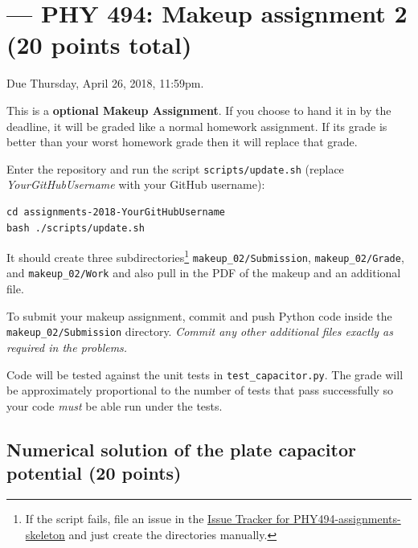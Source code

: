 \documentclass[letterpaper]{scrartcl}
\newcommand{\anumber}{2}
\begin{document}

\setcounter{section}{\anumber}
\addtocounter{section}{-1}
\section{ --- PHY 494: Makeup assignment \anumber{} (20 points total)}

\noindent Due Thursday, April 26, 2018, 11:59pm.

\noindent This is a \textbf{optional Makeup Assignment}. If you choose
to hand it in by the deadline, it will be graded like a normal
homework assignment. If its grade is better than your worst homework
grade then it will replace that grade.

\noindent
{}

Enter the repository and run the script
\texttt{scripts/update.sh} (replace \emph{YourGitHubUsername} with
your GitHub username):
\begin{verbatim}
cd assignments-2018-YourGitHubUsername
bash ./scripts/update.sh 
\end{verbatim} 
It should create three subdirectories\footnote{If the script fails,
  file an issue in the
  \href{https://github.com/ASU-CompMethodsPhysics-PHY494/PHY494-assignments-skeleton/issues}{Issue
    Tracker for PHY494-assignments-skeleton} and just create the
  directories manually.} \texttt{makeup\_0\anumber{}/Submission},
\texttt{makeup\_0\anumber{}/Grade}, and
\texttt{makeup\_0\anumber{}/Work} and also pull in the PDF of the
makeup and an additional file.

To submit your makeup assignment, commit and push Python code inside
the \texttt{makeup\_0\anumber{}/Submission} directory. \emph{Commit
  any other additional files exactly as required in the problems.}

Code will be tested against the unit tests in
\texttt{test\_capacitor.py}. The grade will be approximately
proportional to the number of tests that pass successfully so your
code \emph{must} be able run under the tests.



\subsection{Numerical solution of the plate capacitor potential (20 points)}
\label{sec:capacitor}
\end{document}
